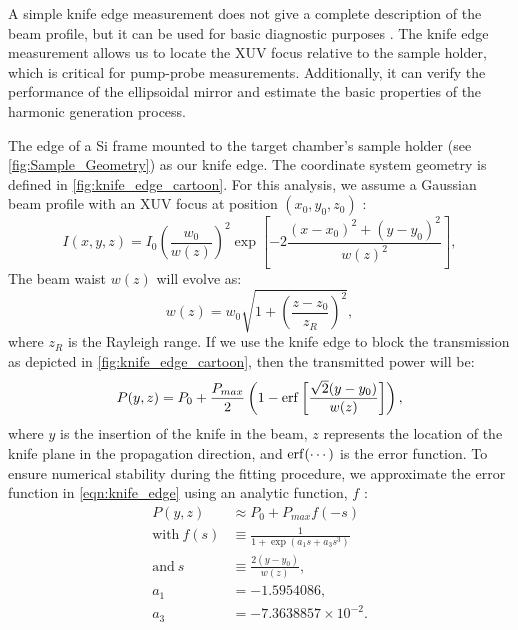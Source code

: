 A simple knife edge measurement does not give a complete description of the beam profile, but it can be used for basic diagnostic purposes \cite{siegmanHowMaybeMeasure1998,siegmanNewDevelopmentsLaser1990,siegmanDefiningMeasuringOptimizing1993}. The knife edge measurement allows us to locate the XUV focus relative to the sample holder, which is critical for pump-probe measurements. Additionally, it can verify the performance of the ellipsoidal mirror and estimate the basic properties of the harmonic generation process.

The edge of a Si frame mounted to the target chamber's sample holder (see \cref{fig:Sample_Geometry}) as our knife edge. The coordinate system geometry is defined in \cref{fig:knife_edge_cartoon}. For this analysis, we assume a Gaussian beam profile with an XUV focus at position $(x_0,y_0,z_0)$ \cite{almeidaHarmonicsBeamsCharacterization2016}:
\begin{equation}
I(x,y,z) = I_0 \left( \frac{w_0}{w(z)} \right)^2 \exp \left[ -2 \frac{ (x-x_0)^2 + (y-y_0)^2 }{w(z)^2} \right],
\end{equation}
The beam waist $w(z)$ will evolve as:
\begin{equation}
w(z) = w_0 \sqrt{ 1 + \left( \frac{z-z_0}{z_R} \right)^2 },
\label{eqn:beam_waist_evolution}
\end{equation}
where $z_R$ is the Rayleigh range. If we use the knife edge to block the transmission as depicted in \cref{fig:knife_edge_cartoon}, then the transmitted power will be:
\begin{equation}
P(y, z) = P_0 + \frac{P_{max}}{2} \left( 1 - \erf \left[ \frac{\sqrt{2}(y-y_0)}{w(z)} \right] \right),
\label{eqn:knife_edge}
\end{equation}
where $y$ is the insertion of the knife in the beam, $z$ represents the location of the knife plane in the propagation direction, and $\erf(\cdots)$ is the error function. To ensure numerical stability during the fitting procedure, we approximate the error function in \cref{eqn:knife_edge} using an analytic function, $f$ \cite{dearaujoMeasurementGaussianLaser2009}:
\begin{equation}
\begin{aligned}
P(y, z) &\approx P_0 + P_{max} f(-s) \\
\textrm{with} \ f(s) &\equiv \frac{1}{1 + \exp(a_1 s + a_3 s^3)} \\
\textrm{and} \ s &\equiv \frac{2(y-y_0)}{w(z)}, \\
a_1 &= -1.5954086, \\
a_3 &= -7.3638857 \times 10^{-2}.
\end{aligned}
\label{eqn:knife_edge_approx}
\end{equation}

